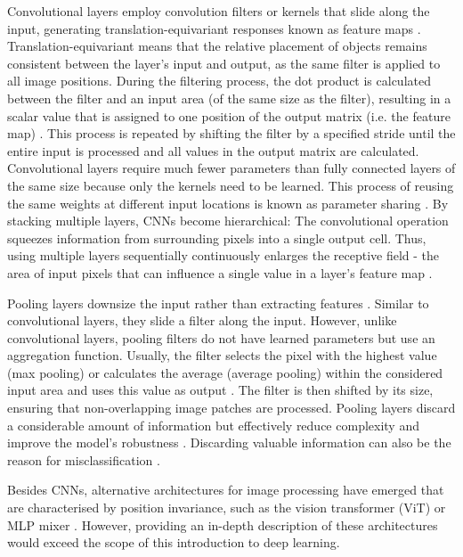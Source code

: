 Convolutional layers employ convolution filters or kernels that slide along the input, generating translation-equivariant \cite{gerber_stride_2020} responses known as feature maps \cite{zhang_parallel_1990}.
Translation-equivariant means that the relative placement of objects remains consistent between the layer's input and output, as the same filter is applied to all image positions.
During the filtering process, the dot product is calculated between the filter and an input area (of the same size as the filter), resulting in a scalar value that is assigned to one position of the output matrix (i.e. the feature map) .
This process is repeated by shifting the filter by a specified stride until the entire input is processed and all values in the output matrix are calculated.
Convolutional layers require much fewer parameters than fully connected layers of the same size because only the kernels need to be learned.
This process of reusing the same weights at different input locations is known as parameter sharing .
By stacking multiple layers, CNNs become hierarchical: The convolutional operation squeezes information from surrounding pixels into a single output cell. Thus, using multiple layers sequentially continuously enlarges the receptive field - the area of input pixels that can influence a single value in a layer's feature map .

Pooling layers downsize the input rather than extracting features .
Similar to convolutional layers, they slide a filter along the input.
However, unlike convolutional layers, pooling filters do not have learned parameters but use an aggregation function.
Usually, the filter selects the pixel with the highest value (max pooling) or calculates the average (average pooling) within the considered input area and uses this value as output \cite{ciresan_flexible_2011}.
The filter is then shifted by its size, ensuring that non-overlapping image patches are processed.
Pooling layers discard a considerable amount of information but effectively reduce complexity and improve the model's robustness \cite{ciresan_flexible_2011}.
Discarding valuable information can also be the reason for misclassification .

Besides CNNs, alternative architectures for image processing have emerged that are characterised by position invariance, such as the vision transformer (ViT)  or MLP mixer . However, providing an in-depth description of these architectures would exceed the scope of this introduction to deep learning.

